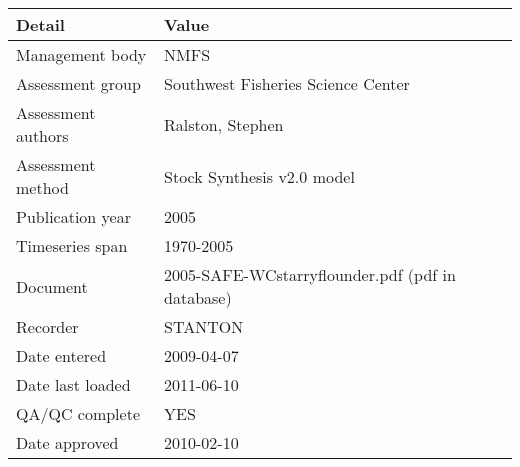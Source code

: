 \begin{table}[htb]
\centering
\begin{tabular}{lp{7cm}}
\toprule
Detail & Value \\
\midrule
Management body    & NMFS                                             \\
Assessment group   & Southwest Fisheries Science Center               \\
Assessment authors & Ralston, Stephen                                 \\
Assessment method  & Stock Synthesis v2.0 model                       \\
Publication year   & 2005                                             \\
Timeseries span    & 1970-2005                                        \\
Document           & 2005-SAFE-WCstarryflounder.pdf (pdf in database) \\
Recorder           & STANTON                                          \\
Date entered       & 2009-04-07                                       \\
Date last loaded   & 2011-06-10                                       \\
QA/QC complete     & YES                                              \\
Date approved      & 2010-02-10                                       \\
\bottomrule
\end{tabular}
\label{tab:assessdet}
\end{table}
